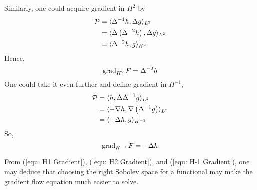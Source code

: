 \documentclass[../dissertation.tex]{subfiles}
\begin{document}
Similarly, one could acquire gradient in $H^2$ by
\begin{align*}
    \mathcal{P} &= \langle \Delta^{-1} h, \Delta g \rangle_{L^2} \\
    &= \langle \Delta \left( \Delta^{-2} h \right), \Delta g \rangle_{L^2} \\
    &= \langle \Delta^{-2} h, g \rangle_{H^2}
\end{align*}
Hence,
\begin{equation}
    \operatorname{grad}_{H^2} F = \Delta^{-2} h
    \label{equ: H2 Gradient}
\end{equation}
One could take it even further and define gradient in $H^{-1}$,
\begin{align*}
    \mathcal{P} &= \langle h, \Delta \Delta^{-1} g \rangle_{L^2} \\
    &= \langle -\nabla h, \nabla \left( \Delta^{-1} g \right) \rangle_{L^2} \\
    &= \langle -\Delta h, g \rangle_{H^{-1}}
\end{align*}
So,
\begin{equation}
    \operatorname{grad}_{H^{-1}} F = -\Delta h
    \label{equ: H-1 Gradient}
\end{equation}
\begin{remark}
    From (\ref{equ: H1 Gradient}), (\ref{equ: H2 Gradient}), and (\ref{equ: H-1 Gradient}), one may deduce that
    choosing the right Sobolev space for a functional may make the gradient flow equation much easier to solve.
\end{remark}
\end{document}
